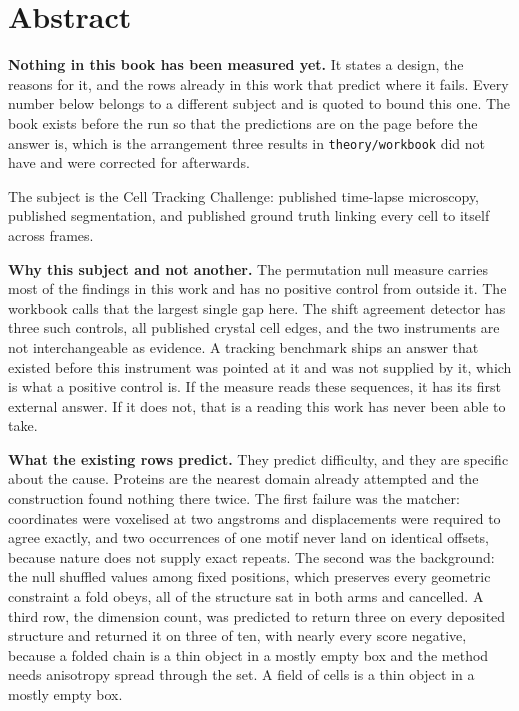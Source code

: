\chapter*{Abstract}

\textbf{Nothing in this book has been measured yet.} It states a design, the reasons for it, and the
rows already in this work that predict where it fails. Every number below belongs to a different
subject and is quoted to bound this one. The book exists before the run so that the predictions are
on the page before the answer is, which is the arrangement three results in \texttt{theory/workbook}
did not have and were corrected for afterwards.

The subject is the Cell Tracking Challenge: published time-lapse microscopy, published segmentation,
and published ground truth linking every cell to itself across frames.

\textbf{Why this subject and not another.} The permutation null measure carries most of the findings
in this work and has no positive control from outside it. The workbook calls that the largest single
gap here. The shift agreement detector has three such controls, all published crystal cell edges, and
the two instruments are not interchangeable as evidence. A tracking benchmark ships an answer that
existed before this instrument was pointed at it and was not supplied by it, which is what a positive
control is. If the measure reads these sequences, it has its first external answer. If it does not,
that is a reading this work has never been able to take.

\textbf{What the existing rows predict.} They predict difficulty, and they are specific about the
cause. Proteins are the nearest domain already attempted and the construction found nothing there
twice. The first failure was the matcher: coordinates were voxelised at two angstroms and
displacements were required to agree exactly, and two occurrences of one motif never land on
identical offsets, because nature does not supply exact repeats. The second was the background: the
null shuffled values among fixed positions, which preserves every geometric constraint a fold obeys,
all of the structure sat in both arms and cancelled. A third row, the dimension count, was
predicted to return three on every deposited structure and returned it on three of ten, with nearly
every score negative, because a folded chain is a thin object in a mostly empty box and the method
needs anisotropy spread through the set. A field of cells is a thin object in a mostly empty box.

